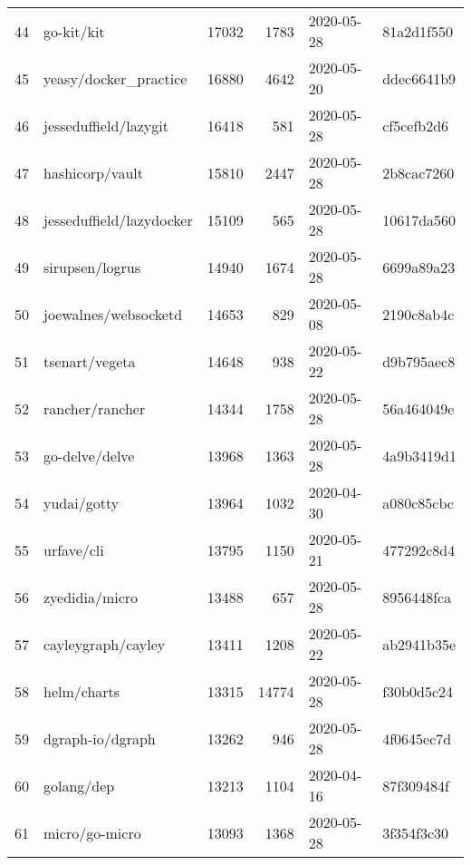 \begin{longtable}{llrrll}
    44  &                                         go-kit/kit &  17032 &   1783 & 2020-05-28 &  81a2d1f550 \\
    45  &                              yeasy/docker\_practice &  16880 &   4642 & 2020-05-20 &  ddec6641b9 \\
    46  &                              jesseduffield/lazygit &  16418 &    581 & 2020-05-28 &  cf5cefb2d6 \\
    47  &                                    hashicorp/vault &  15810 &   2447 & 2020-05-28 &  2b8cac7260 \\
    48  &                           jesseduffield/lazydocker &  15109 &    565 & 2020-05-28 &  10617da560 \\
    49  &                                    sirupsen/logrus &  14940 &   1674 & 2020-05-28 &  6699a89a23 \\
    50  &                               joewalnes/websocketd &  14653 &    829 & 2020-05-08 &  2190c8ab4c \\
    51  &                                     tsenart/vegeta &  14648 &    938 & 2020-05-22 &  d9b795aec8 \\
    52  &                                    rancher/rancher &  14344 &   1758 & 2020-05-28 &  56a464049e \\
    53  &                                     go-delve/delve &  13968 &   1363 & 2020-05-28 &  4a9b3419d1 \\
    54  &                                        yudai/gotty &  13964 &   1032 & 2020-04-30 &  a080c85cbc \\
    55  &                                         urfave/cli &  13795 &   1150 & 2020-05-21 &  477292c8d4 \\
    56  &                                     zyedidia/micro &  13488 &    657 & 2020-05-28 &  8956448fca \\
    57  &                                 cayleygraph/cayley &  13411 &   1208 & 2020-05-22 &  ab2941b35e \\
    58  &                                        helm/charts &  13315 &  14774 & 2020-05-28 &  f30b0d5c24 \\
    59  &                                   dgraph-io/dgraph &  13262 &    946 & 2020-05-28 &  4f0645ec7d \\
    60  &                                         golang/dep &  13213 &   1104 & 2020-04-16 &  87f309484f \\
    61  &                                     micro/go-micro &  13093 &   1368 & 2020-05-28 &  3f354f3c30 \\

\end{longtable}
